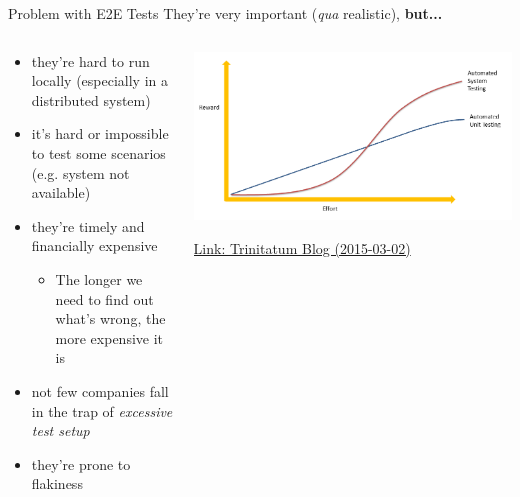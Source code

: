 \begin{frame}{Problem with E2E Tests}
  They're very important (\textit{qua} realistic), \textbf{but...}
  \begin{columns}
    \begin{column}{0.5\textwidth}
      \begin{itemize}
        \item they're hard to run locally (especially in a distributed system)
        \item it's hard or impossible to test some scenarios (e.g. system not available)
        \item they're timely and financially expensive
        \begin{itemize}
          \item The longer we need to find out what's wrong, the more expensive it is
        \end{itemize}
        \item not few companies fall in the trap of \textit{excessive test setup}
        \item they're prone to flakiness
      \end{itemize}
    \end{column}
    \begin{column}{0.5\textwidth}
      \begin{center}
        \includegraphics[width=.9\textwidth]{./assets/e2e-unit-comparison}

        \href{https://www.trinitatum.com/blog/2015/3/2/test-automation-for-endur-part-2-beyond-unit-testing}{Link: Trinitatum Blog (2015-03-02)}
      \end{center}
    \end{column}
    \end{columns}

\end{frame}


